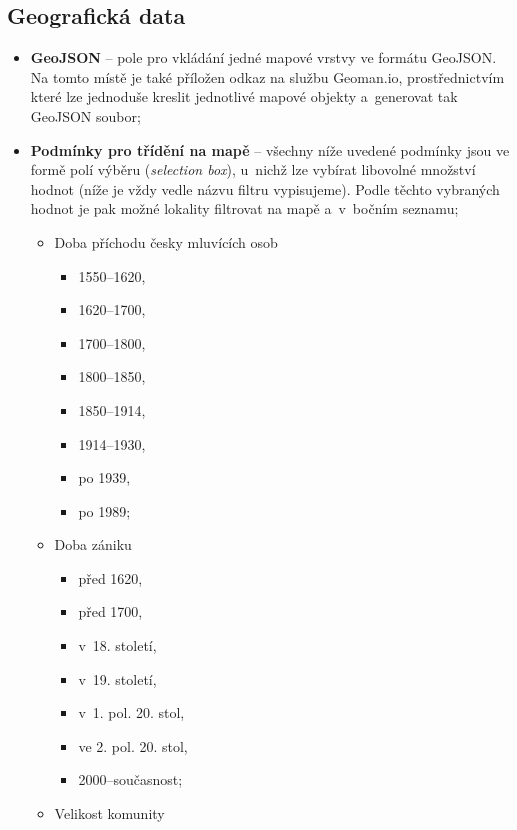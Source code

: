 \hypertarget{geografickuxe1-data}{%
\subsection{Geografická data}\label{geografickuxe1-data}}

\begin{itemize}
\tightlist
\item
  \textbf{GeoJSON} -- pole pro vkládání jedné mapové vrstvy ve formátu GeoJSON. Na tomto místě je také příložen odkaz na službu Geoman.io, prostřednictvím které lze jednoduše kreslit jednotlivé mapové objekty a~generovat tak GeoJSON soubor;
\item
  \textbf{Podmínky pro třídění na mapě} -- všechny níže uvedené podmínky jsou ve formě polí výběru (\emph{selection box}), u~nichž lze vybírat libovolné množství hodnot (níže je vždy vedle názvu filtru vypisujeme). Podle těchto vybraných hodnot je pak možné lokality filtrovat na mapě a~v~bočním seznamu;

  \begin{itemize}
  \tightlist
  \item
    Doba příchodu česky mluvících osob

    \begin{itemize}
    \tightlist
    \item
      1550--1620,
    \item
      1620--1700,
    \item
      1700--1800,
    \item
      1800--1850,
    \item
      1850--1914,
    \item
      1914--1930,
    \item
      po 1939,
    \item
      po 1989;
    \end{itemize}
  \item
    Doba zániku

    \begin{itemize}
    \tightlist
    \item
      před 1620,
    \item
      před 1700,
    \item
      v~18. století,
    \item
      v~19. století,
    \item
      v~1. pol. 20. stol,
    \item
      ve 2. pol. 20. stol,
    \item
      2000--současnost;
    \end{itemize}
  \item
    Velikost komunity


\end{itemize}
\end{itemize}
